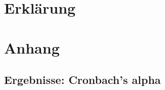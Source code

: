 \documentclass[12pt,smallheadings, bibliography=totoc]{scrartcl}
\begin{document}
\section{Erklärung}
\centering
{}

\pagebreak
\appendix


  \section{Anhang}
  \subsection{Ergebnisse: Cronbach's alpha}
  \label{sec:cron}
  
\end{document}
